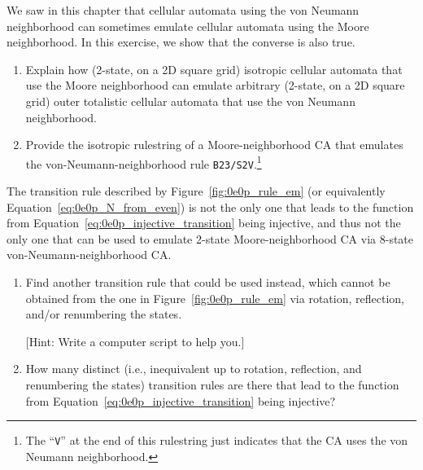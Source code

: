 \begin{multicols}{2}
	
	\mfilbreak
	
	
	\begin{problem}\label{exer:0e0p_iso_in_moore_emulate_von} 
		We saw in this chapter that cellular automata using the von Neumann neighborhood can sometimes emulate cellular automata using the Moore neighborhood. In this exercise, we show that the converse is also true.\smallskip
		
		\begin{enumerate}[label=\bf\color{ocre}(\alph*)]
			\item Explain how (2-state, on a 2D square grid) isotropic cellular automata that use the Moore neighborhood can emulate arbitrary (2-state, on a 2D square grid) outer totalistic cellular automata that use the von Neumann neighborhood.
			
			\item Provide the isotropic rulestring of a Moore-neighborhood CA that emulates the von-Neumann-neighborhood rule \texttt{B23/S2V}.\footnote{The ``\texttt{V}'' at the end of this rulestring just indicates that the CA uses the von Neumann neighborhood.}
		\end{enumerate}
	\end{problem}
	
	
	\mfilbreak
	
	
	\begin{problem}\label{exer:0e0p_even_gen_transition_rule} 
		The transition rule described by Figure~\ref{fig:0e0p_rule_em} (or equivalently Equation~\eqref{eq:0e0p_N_from_even}) is not the only one that leads to the function from Equation~\eqref{eq:0e0p_injective_transition} being injective, and thus not the only one that can be used to emulate 2-state Moore-neighborhood CA via 8-state von-Neumann-neighborhood CA.\smallskip
		
		\begin{enumerate}[label=\bf\color{ocre}(\alph*)]
			\item Find another transition rule that could be used instead, which cannot be obtained from the one in Figure~\ref{fig:0e0p_rule_em} via rotation, reflection, and/or renumbering the states.
			
			[Hint: Write a computer script to help you.]
			
			\item How many distinct (i.e., inequivalent up to rotation, reflection, and renumbering the states) transition rules are there that lead to the function from Equation~\eqref{eq:0e0p_injective_transition} being injective?
			

\end{enumerate}
\end{problem}
\end{multicols}
